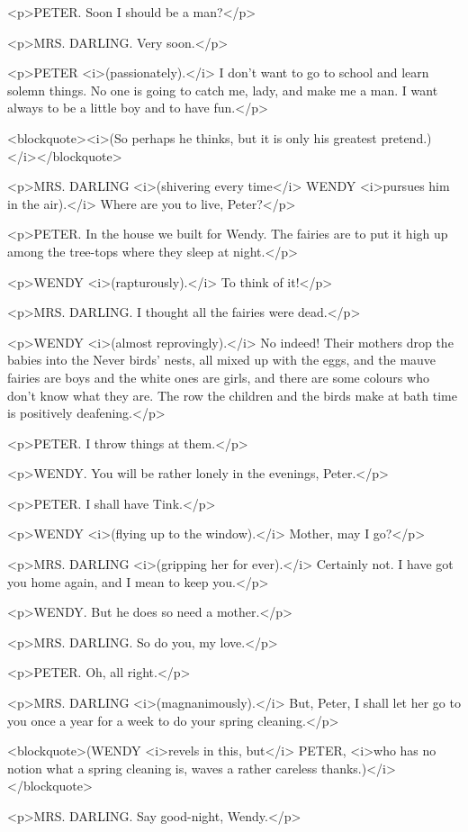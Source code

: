 <p>PETER. Soon I should be a man?</p>

<p>MRS. DARLING. Very soon.</p>

<p>PETER <i>(passionately).</i> I don't want to go to school and learn solemn things. No one is going to catch me, lady, and make me a man. I want always to be a little boy and to have fun.</p>

<blockquote><i>(So perhaps he thinks, but it is only his greatest pretend.)</i></blockquote>

<p>MRS. DARLING <i>(shivering every time</i> WENDY <i>pursues him in the air).</i> Where are you to live, Peter?</p>

<p>PETER. In the house we built for Wendy. The fairies are to put it high up among the tree-tops where they sleep at night.</p>

<p>WENDY <i>(rapturously).</i> To think of it!</p>

<p>MRS. DARLING. I thought all the fairies were dead.</p>

<p>WENDY <i>(almost reprovingly).</i> No indeed! Their mothers drop the babies into the Never birds' nests, all mixed up with the eggs, and the mauve fairies are boys and the white ones are girls, and there are some colours who don't know what they are. The row the children and the birds make at bath time is positively deafening.</p>

<p>PETER. I throw things at them.</p>

<p>WENDY. You will be rather lonely in the evenings, Peter.</p>

<p>PETER. I shall have Tink.</p>

<p>WENDY <i>(flying up to the window).</i> Mother, may I go?</p>

<p>MRS. DARLING <i>(gripping her for ever).</i> Certainly not. I have got you home again, and I mean to keep you.</p>

<p>WENDY. But he does so need a mother.</p>

<p>MRS. DARLING. So do you, my love.</p>

<p>PETER. Oh, all right.</p>

<p>MRS. DARLING <i>(magnanimously).</i> But, Peter, I shall let her go to you once a year for a week to do your spring cleaning.</p>

<blockquote>(WENDY <i>revels in this, but</i> PETER, <i>who has no notion what a spring cleaning is, waves a rather careless thanks.)</i></blockquote>

<p>MRS. DARLING. Say good-night, Wendy.</p>

